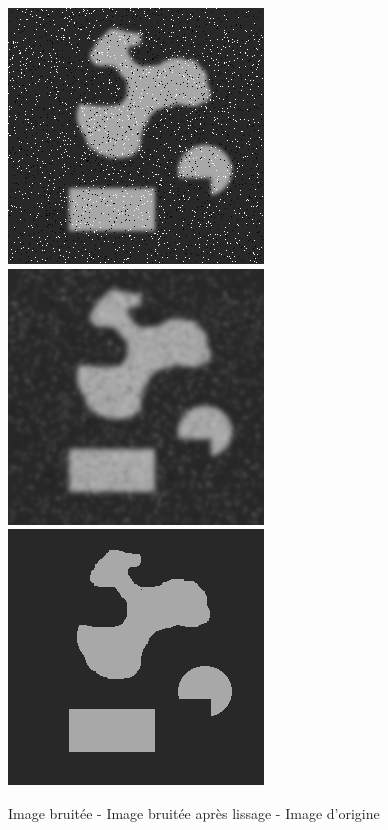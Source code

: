 \documentclass[paper=a4, fontsize=11pt]{scrartcl} %
\begin{document}
\begin{figure}[h!]

\label{3images}
\caption{Image bruitée -  Image bruitée après lissage  - Image d'origine}
\centering
\includegraphics[scale=0.53]{images/rapport/formes1pets1.png} 
\includegraphics[scale=0.53]{images/rapport/temporel_pets1sig2.png}
\includegraphics[scale=0.53]{images/rapport/formes1.png}  
\end{figure}
\end{document}
